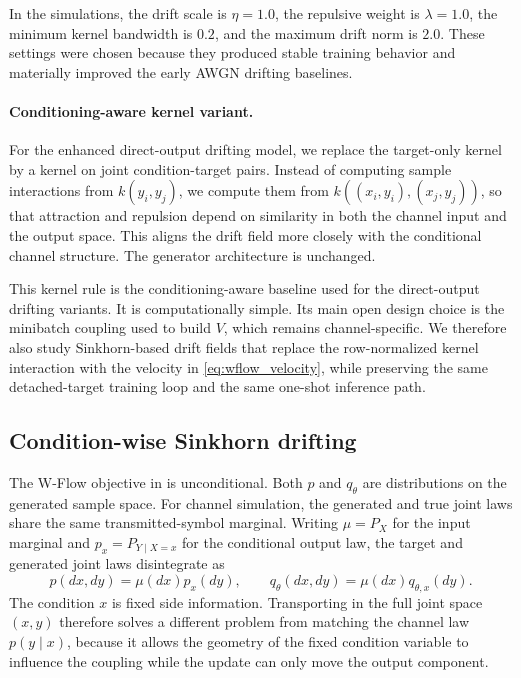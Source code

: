\documentclass[10pt,journal]{IEEEtran}
\begin{document}
In the simulations, the drift scale is \(\eta=1.0\), the repulsive weight is \(\lambda=1.0\), the minimum kernel bandwidth is \(0.2\), and the maximum drift norm is \(2.0\).
These settings were chosen because they produced stable training behavior and materially improved the early AWGN drifting baselines.

\paragraph{Conditioning-aware kernel variant.}
For the enhanced direct-output drifting model, we replace the target-only kernel by a kernel on joint condition-target pairs.
Instead of computing sample interactions from \(k(y_i,y_j)\), we compute them from \(k((x_i,y_i),(x_j,y_j))\), so that attraction and repulsion depend on similarity in both the channel input and the output space.
This aligns the drift field more closely with the conditional channel structure.
The generator architecture is unchanged.

This kernel rule is the conditioning-aware baseline used for the direct-output drifting variants.
It is computationally simple.
Its main open design choice is the minibatch coupling used to build \(V\), which remains channel-specific.
We therefore also study Sinkhorn-based drift fields that replace the row-normalized kernel interaction with the velocity in \eqref{eq:wflow_velocity}, while preserving the same detached-target training loop and the same one-shot inference path.

\subsection{Condition-wise Sinkhorn drifting}
The W-Flow objective in \cite{han2026wflow} is unconditional.
Both \(p\) and \(q_\theta\) are distributions on the generated sample space.
For channel simulation, the generated and true joint laws share the same transmitted-symbol marginal.
Writing \(\mu=P_X\) for the input marginal and \(p_x=P_{Y\mid X=x}\) for the conditional output law, the target and generated joint laws disintegrate as
\begin{equation}
p(dx,dy)=\mu(dx)p_x(dy),
\qquad
q_\theta(dx,dy)=\mu(dx)q_{\theta,x}(dy).
\end{equation}
The condition \(x\) is fixed side information.
Transporting in the full joint space \((x,y)\) therefore solves a different problem from matching the channel law \(p(y\mid x)\), because it allows the geometry of the fixed condition variable to influence the coupling while the update can only move the output component.
\end{document}

